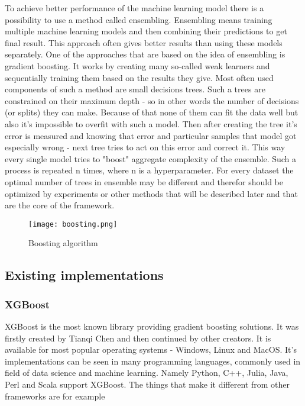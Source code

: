 \documentclass[a4paper,twoside,12pt]{book}
\begin{document}
To achieve better performance of the machine learning model there is a possibility to use a method called ensembling. Ensembling means training multiple machine learning models and then combining their predictions to get final result. This approach often gives better results than using these models separately. 
One of the approaches that are based on the idea of ensembling is gradient boosting.
It works by creating many so-called weak learners and sequentially training them based on the results they give. Most often used components of such a method are small decisions trees. Such a trees are constrained on their maximum depth - so in other words the number of decisions (or splits) they can make. 
Because of that none of them can fit the data well but also it's impossible to overfit with such a model.
Then after creating the tree it's error is measured and knowing that error and particular samples that model got especially wrong - next tree tries to act on this error and correct it. This way every single model tries to "boost" aggregate complexity of the ensemble. Such a process is repeated n times, where n is a hyperparameter. For every dataset the optimal number of trees in ensemble may be different and therefor should be optimized by experiments or other methods that will be described later and that are the core of the framework.  

\begin{figure}[h]
    \centering
    \texttt{[image: boosting.png]}
    \caption{Boosting algorithm}
    \label{fig:mesh1}
\end{figure}

\subsection{Existing implementations}

\subsubsection{XGBoost}

XGBoost is the most known library providing gradient boosting solutions. It was firstly created by Tianqi Chen and then continued by other creators. It is available for most popular operating systems - Windows, Linux and MacOS. It's implementations can be seen in many programming languages, commonly used in field of data science and machine learning. Namely Python, C++, Julia, Java, Perl and Scala support XGBoost. 
The things that make it different from other frameworks are  for example
\end{document}
